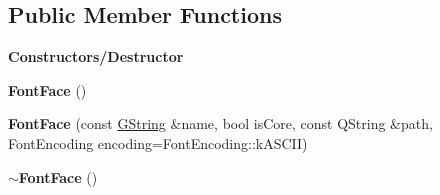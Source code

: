 \subsection*{Public Member Functions}
\begin{Indent}\textbf{ Constructors/\+Destructor}\par
\begin{DoxyCompactItemize}
\item 
\mbox{\label{classrev_1_1_font_face_abece5d91c8b6b856560ad5f728e4751f}} 
{\bfseries Font\+Face} ()
\item 
\mbox{\label{classrev_1_1_font_face_a286b13b064454403eac466a824c21a44}} 
{\bfseries Font\+Face} (const \mbox{\hyperlink{classrev_1_1_g_string}{G\+String}} \&name, bool is\+Core, const Q\+String \&path, Font\+Encoding encoding=Font\+Encoding\+::k\+A\+S\+C\+II)
\item 
\mbox{\label{classrev_1_1_font_face_a9d49f221eef1b01d8f0eb65d05b15082}} 
{\bfseries $\sim$\+Font\+Face} ()
\end{DoxyCompactItemize}
\end{Indent}
